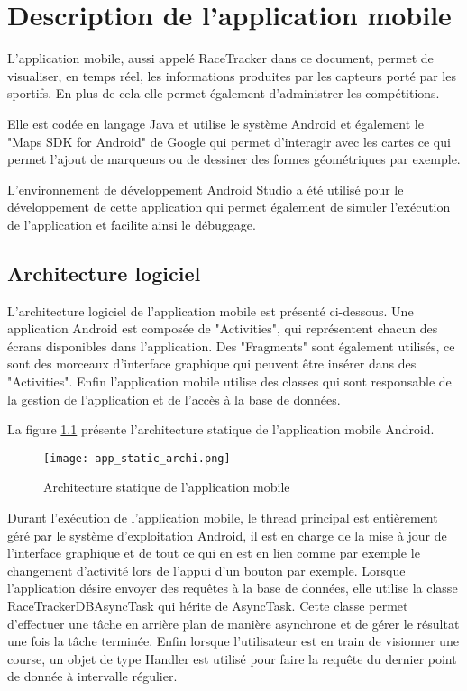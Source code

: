 
\chapter{Description de l'application mobile}\label{ch:app_mobile}

L'application mobile, aussi appelé RaceTracker dans ce document, permet de visualiser, en temps réel, les informations produites par les capteurs porté par les sportifs. En plus de cela elle permet également d'administrer les compétitions.

Elle est codée en langage Java et utilise le système Android et également le "Maps SDK for Android" de Google qui permet d'interagir avec les cartes ce qui permet l'ajout de marqueurs ou de dessiner des formes géométriques par exemple.

L'environnement de développement Android Studio a été utilisé pour le développement de cette application qui permet également de simuler l'exécution de l'application et facilite ainsi le débuggage.


\section{Architecture logiciel}

L'architecture logiciel de l'application mobile est présenté ci-dessous. Une application Android est composée de "Activities", qui représentent chacun des écrans disponibles dans l'application. Des "Fragments" sont également utilisés, ce sont des morceaux d'interface graphique qui peuvent être insérer dans des "Activities". Enfin l'application mobile utilise des classes qui sont responsable de la gestion de l'application et de l'accès à la base de données.

La figure \ref{fig:app_static_archi} présente l'architecture statique de l'application mobile Android.

\begin{figure}[htb]
\centering 
\texttt{[image: app\_static\_archi.png]} 
\caption{Architecture statique de l'application mobile}
\label{fig:app_static_archi}
\end{figure}

Durant l'exécution de l'application mobile, le thread principal est entièrement géré par le système d'exploitation Android, il est en charge de la mise à jour de l'interface graphique et de tout ce qui en est en lien comme par exemple le changement d'activité lors de l'appui d'un bouton par exemple. Lorsque l'application désire envoyer des requêtes à la base de données, elle utilise la classe RaceTrackerDBAsyncTask qui hérite de AsyncTask. Cette classe permet d'effectuer une tâche en arrière plan de manière asynchrone et de gérer le résultat une fois la tâche terminée. Enfin lorsque l'utilisateur est en train de visionner une course, un objet de type Handler est utilisé pour faire la requête du dernier point de donnée à intervalle régulier.

